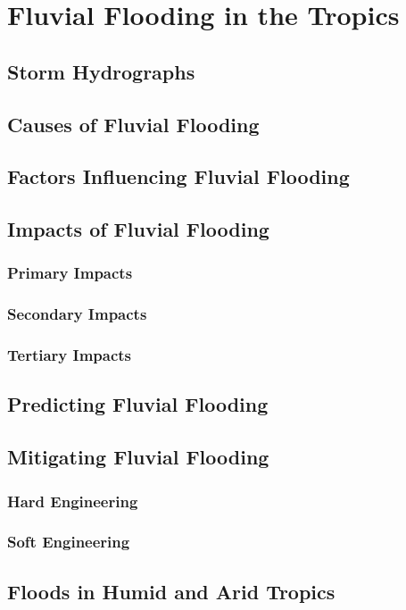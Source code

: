 \documentclass[../main]{subfiles}
\begin{document}
\section{Fluvial Flooding in the Tropics}

	\subsection{Storm Hydrographs}

	\subsection{Causes of Fluvial Flooding}

	\subsection{Factors Influencing Fluvial Flooding}

	\subsection{Impacts of Fluvial Flooding}

	\subsubsection{Primary Impacts}

	\subsubsection{Secondary Impacts}

	\subsubsection{Tertiary Impacts}

	\subsection{Predicting Fluvial Flooding}

	\subsection{Mitigating Fluvial Flooding}

	\subsubsection{Hard Engineering}

	\subsubsection{Soft Engineering}

	\subsection{Floods in Humid and Arid Tropics}
\end{document}
